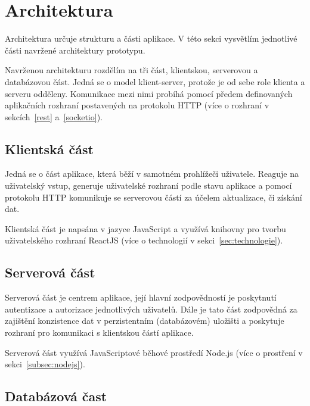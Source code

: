
\section{Architektura}\label{sec:architektura}

Architektura určuje strukturu a části aplikace.
V této sekci vysvětlím jednotlivé části navržené architektury prototypu.

Navrženou architekturu rozdělím na tři část, klientskou, serverovou a databázovou část.
Jedná se o model klient-server, protože je od sebe role klienta a serveru odděleny.
Komunikace mezi nimi probíhá pomocí předem definovaných aplikačních rozhraní postavených na protokolu \gls{HTTP} (více o rozhraní v sekcích~\ref{rest} a~\ref{socketio}).

\subsection{Klientská část}\label{subsec:klientskáČást}

Jedná se o část aplikace, která běží v samotném prohlížeči uživatele.
Reaguje na uživatelský vstup, generuje uživatelské rozhraní podle stavu aplikace a pomocí protokolu \gls{HTTP} komunikuje se serverovou částí za účelem aktualizace, či získání dat.

Klientská část je napsána v jazyce JavaScript a využívá knihovny pro tvorbu uživatelského rozhraní ReactJS (více o technologií v sekci~\ref{sec:technologie}).

\subsection{Serverová část}\label{subsec:serverováČást}

Serverová část je centrem aplikace, její hlavní zodpovědností je poskytnutí autentizace a autorizace jednotlivých uživatelů.
Dále je tato část zodpovědná za zajištění konzistence dat v perzistentním (databázovém) uložišti a poskytuje rozhraní pro komunikaci s klientskou částí aplikace.

Serverová část využívá JavaScriptové běhové prostředí Node.js (více o prostření v sekci~\ref{subsec:nodejs}).

\subsection{Databázová čast}\label{subsec:databázováČast}

